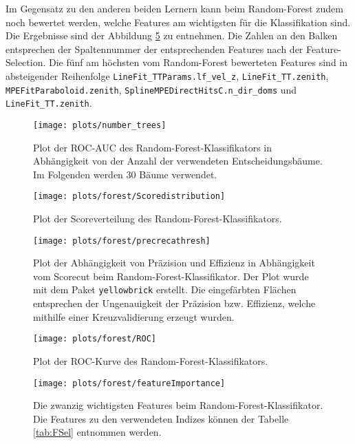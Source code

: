 Im Gegensatz zu den anderen beiden Lernern kann beim Random-Forest zudem noch bewertet werden, welche Features am wichtigsten für die Klassifikation sind. Die Ergebnisse sind der Abbildung \ref{fig:RF_FI} zu entnehmen. Die Zahlen an den Balken entsprechen der Spaltennummer der entsprechenden Features nach der Feature-Selection. Die fünf am höchsten vom Random-Forest bewerteten Features sind in absteigender Reihenfolge \texttt{LineFit\_TTParams.lf\_vel\_z}, \texttt{LineFit\_TT.zenith}, \texttt{MPEFitParaboloid.zenith}, \texttt{SplineMPEDirectHitsC.n\_dir\_doms} und \texttt{LineFit\_TT.zenith}.

\begin{figure}
	\centering
	\texttt{[image: plots/number\_trees]}
	\caption{Plot der ROC-AUC des Random-Forest-Klassifikators in Abhängigkeit von der Anzahl der verwendeten Entscheidungsbäume. Im Folgenden werden 30 Bäume verwendet.}
	\label{fig:num_trees}
\end{figure}

\begin{figure}
	\centering
	\texttt{[image: plots/forest/Scoredistribution]}
	\caption{Plot der Scoreverteilung des Random-Forest-Klassifikators.}
	\label{fig:RF_SD}
\end{figure}

\begin{figure}
	\centering
	\texttt{[image: plots/forest/precrecathresh]}
	\caption{Plot der Abhängigkeit von Präzision und Effizienz in Abhängigkeit vom Scorecut beim Random-Forest-Klassifikator. Der Plot wurde mit dem Paket \texttt{yellowbrick} \cite{yellowbrick} erstellt. Die eingefärbten Flächen entsprechen der Ungenauigkeit der Präzision bzw. Effizienz, welche mithilfe einer Kreuzvalidierung erzeugt wurden.}
	\label{fig:RF_PRT}
\end{figure}

\begin{figure}
	\centering
	\texttt{[image: plots/forest/ROC]}
	\caption{Plot der ROC-Kurve des Random-Forest-Klassifikators.}
	\label{fig:RF_ROC}
\end{figure}


\begin{figure}
	\centering
	\texttt{[image: plots/forest/featureImportance]}
	\caption{Die zwanzig wichtigsten Features beim Random-Forest-Klassifikator. Die Features zu den verwendeten Indizes können der Tabelle \ref{tab:FSel} entnommen werden.}
	\label{fig:RF_FI}
\end{figure}



